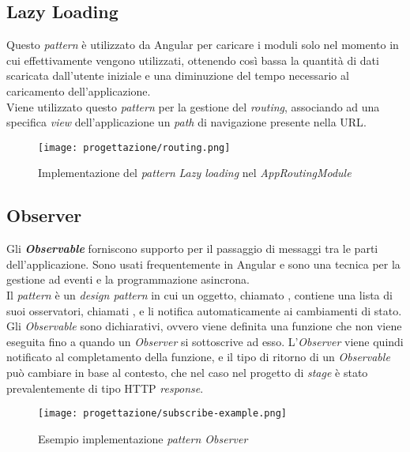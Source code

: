 \subsection{Lazy Loading}
Questo \textit{pattern} è utilizzato da Angular per caricare i moduli solo nel momento in cui effettivamente vengono utilizzati, ottenendo così bassa la quantità di dati scaricata dall'utente iniziale e una diminuzione del tempo necessario al caricamento dell'applicazione.\\
Viene utilizzato questo \textit{pattern} per la gestione del \textit{routing}, associando ad una specifica \textit{view} dell'applicazione un \textit{path} di navigazione presente nella \gls{URL}.
\begin{figure}[H] 
    \centering 
    \texttt{[image: progettazione/routing.png]}
    \caption{Implementazione del \textit{pattern} \textit{Lazy loading} nel \textit{AppRoutingModule}}
\end{figure}
\subsection{Observer}
Gli \textit{\textbf{Observable}} forniscono supporto per il passaggio di messaggi tra le parti dell'applicazione. Sono usati frequentemente in Angular e sono una tecnica per la gestione ad eventi e la programmazione asincrona.\\
Il \textit{pattern }  è un \textit{design pattern} in cui un oggetto, chiamato , contiene una lista di suoi osservatori, chiamati , e li notifica automaticamente ai cambiamenti di stato.\\
Gli \textit{Observable} sono dichiarativi, ovvero viene definita una funzione che non viene eseguita fino a quando un \textit{Observer} si sottoscrive ad esso. L'\textit{Observer} viene quindi notificato al completamento della funzione, e il tipo di ritorno di un \textit{Observable} può cambiare in base al contesto, che nel caso nel progetto di \textit{stage} è stato prevalentemente di tipo HTTP \textit{response}. \\
\begin{figure}[H] 
    \centering 
    \texttt{[image: progettazione/subscribe-example.png]}
    \caption{Esempio implementazione \textit{pattern Observer}}
\end{figure}
\newpage
